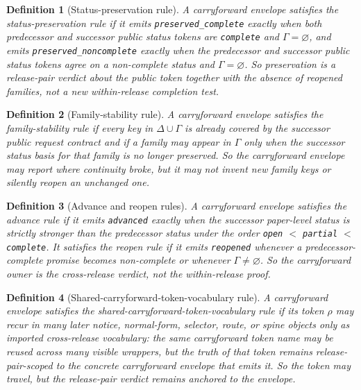 \documentclass[11pt]{article}
\newtheorem{definition}{Definition}
\begin{document}
\begin{definition}[Status-preservation rule]
A carryforward envelope satisfies the \emph{status-preservation rule} if it emits \texttt{preserved\_complete} exactly when both predecessor and successor public status tokens are \texttt{complete} and $\Gamma=\varnothing$, and emits \texttt{preserved\_noncomplete} exactly when the predecessor and successor public status tokens agree on a non-complete status and $\Gamma=\varnothing$.
So preservation is a release-pair verdict about the public token together with the absence of reopened families, not a new within-release completion test.
\end{definition}

\begin{definition}[Family-stability rule]
A carryforward envelope satisfies the \emph{family-stability rule} if every key in $\Delta\cup\Gamma$ is already covered by the successor public request contract and if a family may appear in $\Gamma$ only when the successor status basis for that family is no longer preserved.
So the carryforward envelope may report where continuity broke, but it may not invent new family keys or silently reopen an unchanged one.
\end{definition}

\begin{definition}[Advance and reopen rules]
A carryforward envelope satisfies the \emph{advance rule} if it emits \texttt{advanced} exactly when the successor paper-level status is strictly stronger than the predecessor status under the order \texttt{open} $<$ \texttt{partial} $<$ \texttt{complete}.
It satisfies the \emph{reopen rule} if it emits \texttt{reopened} whenever a predecessor-complete promise becomes non-complete or whenever $\Gamma\neq\varnothing$.
So the carryforward owner is the cross-release verdict, not the within-release proof.
\end{definition}

\begin{definition}[Shared-carryforward-token-vocabulary rule]
A carryforward envelope satisfies the \emph{shared-carryforward-token-vocabulary rule} if its token $\rho$ may recur in many later notice, normal-form, selector, route, or spine objects only as imported cross-release vocabulary: the same carryforward token name may be reused across many visible wrappers, but the truth of that token remains release-pair-scoped to the concrete carryforward envelope that emits it.
So the token may travel, but the release-pair verdict remains anchored to the envelope.
\end{definition}
\end{document}
